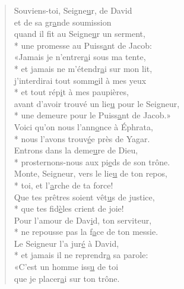 
\begin{verse}
Souviens-toi, Seigne\underline{u}r, de David \\
et de sa gr\underline{a}nde soumission \\
quand il fit au Seigne\underline{u}r un serment, \\*
une promesse au Puiss\underline{a}nt de Jacob: \\

«Jamais je n’entrer\underline{a}i sous ma tente, \\*
et jamais ne m’étendr\underline{a}i sur mon lit, \\
j’interdirai tout somm\underline{e}il à mes yeux \\*
et tout rép\underline{i}t à mes paupières, \\
avant d’avoir trouvé un lie\underline{u} pour le Seigneur, \\*
une demeure pour le Puiss\underline{a}nt de Jacob.» \\

Voici qu’on nous l’ann\underline{o}nce à Éphrata, \\*
nous l’avons trouv\underline{é}e près de Yagar. \\
Entrons dans la deme\underline{u}re de Dieu, \\*
prosternons-nous aux pi\underline{e}ds de son trône. \\

Monte, Seigneur, vers le lie\underline{u} de ton repos, \\*
toi, et l’\underline{a}rche de ta force! \\
Que tes prêtres soient vêt\underline{u}s de justice, \\*
que tes fid\underline{è}les crient de joie! \\

Pour l’amour de Dav\underline{i}d, ton serviteur, \\*
ne repousse pas la f\underline{a}ce de ton messie. \\

Le Seigneur l’a jur\underline{é} à David, \\*
et jamais il ne reprendr\underline{a} sa parole: \\
«C’est un homme iss\underline{u} de toi \\
que je placer\underline{a}i sur ton trône. \\


\end{verse}
